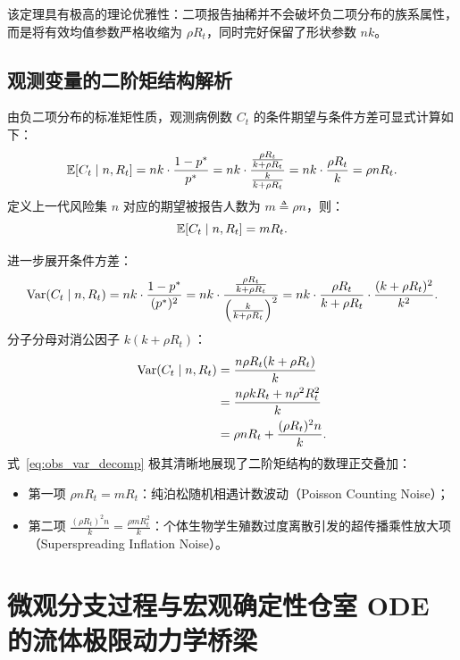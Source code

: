 该定理具有极高的理论优雅性：二项报告抽稀并不会破坏负二项分布的族系属性，而是将有效均值参数严格收缩为 $\rho R_t$，同时完好保留了形状参数 $nk$。

\subsection{观测变量的二阶矩结构解析}
由负二项分布的标准矩性质，观测病例数 $C_t$ 的条件期望与条件方差可显式计算如下：
\begin{equation}
\operatorname{\mathbb{E}}[C_t \mid n, R_t] = nk \cdot \frac{1 - p^*}{p^*} = nk \cdot \frac{\frac{\rho R_t}{k + \rho R_t}}{\frac{k}{k + \rho R_t}} = nk \cdot \frac{\rho R_t}{k} = \rho n R_t.
\end{equation}
定义上一代风险集 $n$ 对应的期望被报告人数为 $m \triangleq \rho n$，则：
\begin{equation}
\operatorname{\mathbb{E}}[C_t \mid n, R_t] = m R_t.
\end{equation}

进一步展开条件方差：
\begin{equation}
\operatorname{Var}(C_t \mid n, R_t) = nk \cdot \frac{1 - p^*}{(p^*)^2} = nk \cdot \frac{\frac{\rho R_t}{k + \rho R_t}}{\left( \frac{k}{k + \rho R_t} \right)^2} = nk \cdot \frac{\rho R_t}{k + \rho R_t} \cdot \frac{(k + \rho R_t)^2}{k^2}.
\end{equation}
分子分母对消公因子 $k(k + \rho R_t)$：
\begin{align}
\operatorname{Var}(C_t \mid n, R_t) &= \frac{n \rho R_t (k + \rho R_t)}{k} \notag \\
&= \frac{n \rho k R_t + n \rho^2 R_t^2}{k} \notag \\
&= \rho n R_t + \frac{(\rho R_t)^2 n}{k}. \label{eq:obs_var_decomp}
\end{align}
式~\eqref{eq:obs_var_decomp} 极其清晰地展现了二阶矩结构的数理正交叠加：
\begin{itemize}
    \item 第一项 $\rho n R_t = m R_t$：纯泊松随机相遇计数波动（Poisson Counting Noise）；
    \item 第二项 $\frac{(\rho R_t)^2 n}{k} = \frac{\rho m R_t^2}{k}$：个体生物学生殖数过度离散引发的超传播乘性放大项（Superspreading Inflation Noise）。
\end{itemize}

\section{微观分支过程与宏观确定性仓室 ODE 的流体极限动力学桥梁}\label{sec:fluid_limit}

